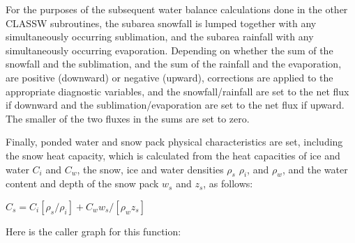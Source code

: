 For the purposes of the subsequent water balance calculations done in the other C\+L\+A\+S\+S\+W subroutines, the subarea snowfall is lumped together with any simultaneously occurring sublimation, and the subarea rainfall with any simultaneously occurring evaporation. Depending on whether the sum of the snowfall and the sublimation, and the sum of the rainfall and the evaporation, are positive (downward) or negative (upward), corrections are applied to the appropriate diagnostic variables, and the snowfall/rainfall are set to the net flux if downward and the sublimation/evaporation are set to the net flux if upward. The smaller of the two fluxes in the sums are set to zero.

Finally, ponded water and snow pack physical characteristics are set, including the snow heat capacity, which is calculated from the heat capacities of ice and water $C_i$ and $C_w$, the snow, ice and water densities $\rho_s$ $\rho_i$, and $\rho_w$, and the water content and depth of the snow pack $w_s$ and $z_s$, as follows\+:

$C_s = C_i [\rho_s /\rho_i] + C_w w_s /[\rho_w z_s]$

Here is the caller graph for this function\+:


